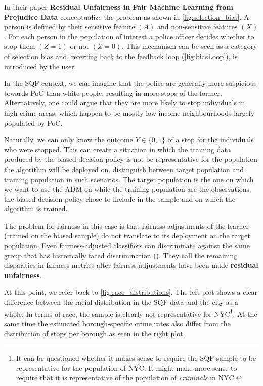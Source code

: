 In their paper \textbf{Residual Unfairness in Fair Machine Learning from Prejudice Data} \cite{kallus2018} conceptualize the problem as shown in \autoref{fig:selection_bias}.
A person is defined by their sensitive feature $(A)$ and non-sensitive features $(X)$. For each person in the population of interest a police officer decides whether to stop them $(Z = 1)$ or not $(Z = 0)$. This mechanism can be seen as a category of selection bias and, referring back to the feedback loop (\autoref{fig:biasLoop}), is introduced by the user.\par
In the SQF context, we can imagine that the police are generally more suspicious towards PoC than white people, resulting in more stops of the former. Alternatively, one could argue that they are more likely to stop individuals in high-crime areas, which happen to be mostly low-income neighbourhoods largely populated by PoC.\par
Naturally, we can only know the outcome $Y \in \{0, 1\}$ of a stop for the individuals who were stopped. This can create a situation in which the training data produced by the biased decision policy is not be representative for the population the algorithm will be deployed on.
\cite{kallus2018} distinguish between target population and training population in such scenarios. The target population is the one on which we want to use the ADM on while the training population are the observations the biased decision policy chose to include in the sample and on which the algorithm is trained.\par
The problem for fairness in this case is that fairness adjustments of the learner (trained on the biased sample) do not translate to its deployment on the target population. Even fairness-adjusted classifiers can discriminate against the same group that has historically faced discrimination (\cite{kallus2018}). They call the remaining disparities in fairness metrics after fairness adjustments have been made \textbf{residual unfairness}.\par
At this point, we refer back to \autoref{fig:race_distributions}. The left plot shows a clear difference between the racial distribution in the SQF data and the city as a whole. In terms of race, the sample is clearly not representative for NYC\footnote{It can be questioned whether it makes sense to require the SQF sample to be representative for the population of NYC. It might make more sense to require that it is representative of the population of \textit{criminals} in NYC.}. At the same time the estimated borough-specific crime rates also differ from the distribution of stops per borough as seen in the right plot.\par
